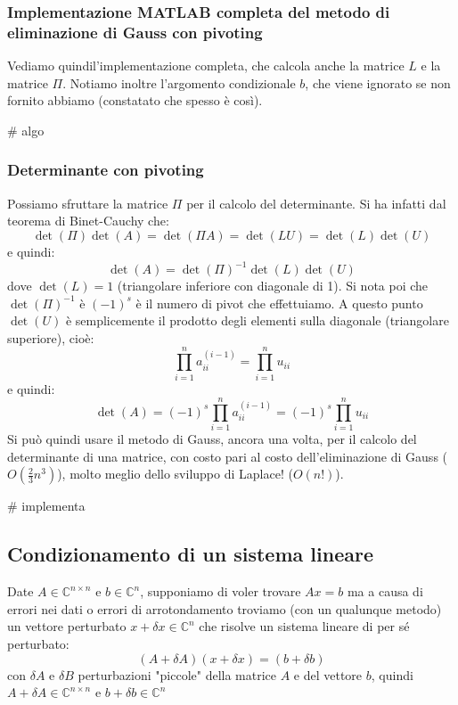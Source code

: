 \documentclass[a4paper,11pt]{article}
\begin{document}
\subsubsection{Implementazione MATLAB completa del metodo di eliminazione di Gauss con pivoting}
Vediamo quindil'implementazione completa, che calcola anche la matrice $L$ e la matrice $\Pi$.
Notiamo inoltre l'argomento condizionale $b$, che viene ignorato se non fornito abbiamo (constatato che spesso è così).

# algo

\subsubsection{Determinante con pivoting}
Possiamo sfruttare la matrice $\Pi$ per il calcolo del determinante.
Si ha infatti dal teorema di Binet-Cauchy che:
$$
\det(\Pi) \det(A) = \det(\Pi A) = \det(L U) = \det(L) \det(U)
$$
e quindi:
$$
\det(A) = \det(\Pi)^{-1} \det(L) \det(U)
$$
dove $\det(L) = 1$ (triangolare inferiore con diagonale di 1).
Si nota poi che $\det(\Pi)^{-1}$ è $(-1)^s$ è il numero di pivot che effettuiamo.
A questo punto $\det(U)$ è semplicemente il prodotto degli elementi sulla diagonale (triangolare superiore), cioè:
$$
\prod_{i = 1}^n a_{ii}^{(i - 1)} = \prod_{i = 1}^n u_{ii}
$$
e quindi:
$$
\det(A) = (-1)^s \prod_{i = 1}^n a_{ii}^{(i - 1)} = (-1)^s \prod_{i = 1}^n u_{ii}
$$
Si può quindi usare il metodo di Gauss, ancora una volta, per il calcolo del determinante di una matrice, con costo pari al costo dell'eliminazione di Gauss ($O(\frac{2}{3}n^3)$), molto meglio dello sviluppo di Laplace! ($O(n!)$).

# implementa 

\subsection{Condizionamento di un sistema lineare}
Date $A \in \mathbb{C}^{n \times n}$ e $b \in \mathbb{C}^n$, supponiamo di voler trovare $Ax = b$ ma a causa di errori nei dati o errori di arrotondamento troviamo (con un qualunque metodo) un vettore perturbato $x + \delta x \in \mathbb{C}^n$ che risolve un sistema lineare di per sé perturbato:
$$
(A + \delta A) (x + \delta x) = (b + \delta b)
$$
con $\delta A$ e $\delta B$ perturbazioni "piccole" della matrice $A$ e del vettore $b$, quindi $A + \delta A \in \mathbb{C}^{n \times n}$ e $b + \delta b \in \mathbb{C}^n$
\end{document}
